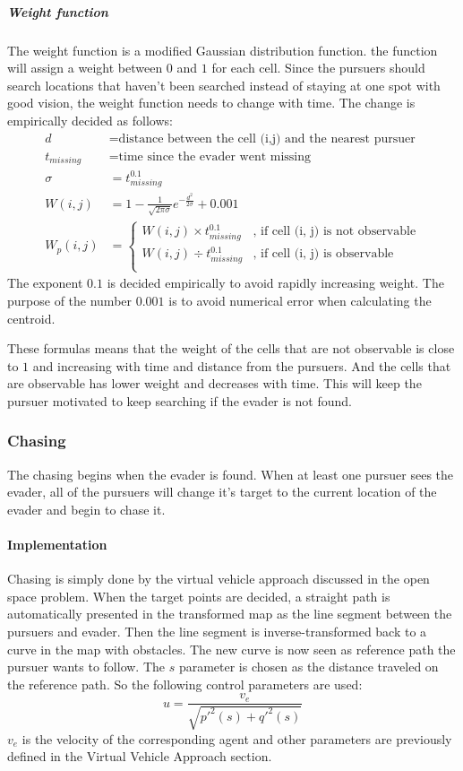 \documentclass[ebook,11pt] {kth-mag}
\begin{document}
\subparagraph{Weight function}
The weight function is a modified Gaussian distribution function. the function will assign a weight between $0$ and $1$ for each cell. Since the pursuers should search locations that haven't been searched instead of staying at one spot with good vision, the weight function needs to change with time. The change is empirically decided as follows: 
\begin{equation}
\begin{split}
d & = \textrm{distance between the cell (i,j) and the nearest pursuer} \\
t_{missing} & = \textrm{time since the evader went missing} \\
\sigma & = t_{missing}^{0.1} \\
W(i, j) & = 1-\frac{1}{\sqrt{2 \pi \sigma}} e^{-\frac{d^2}{2\sigma}}+0.001 \\ 
W_p(i, j) & = 
\begin{cases}
W(i, j)\times t_{missing}^{0.1} & \textrm{, if cell (i, j) is not observable} \\
W(i, j)\div t_{missing}^{0.1} & \textrm{, if cell (i, j) is observable} \\
\end{cases}
\end{split}
\end{equation}
The exponent $0.1$ is decided empirically to avoid rapidly increasing weight. The purpose of the number $0.001$ is to avoid numerical error when calculating the centroid. 

These formulas means that the weight of the cells that are not observable is close to $1$ and increasing with time and distance from the pursuers. And the cells that are observable has lower weight and decreases with time. This will keep the pursuer motivated to keep searching if the evader is not found. 

\subsubsection{Chasing}
The chasing begins when the evader is found. When at least one pursuer sees the evader, all of the pursuers will change it's target to the current location of the evader and begin to chase it. 

\paragraph{Implementation}
Chasing is simply done by the virtual vehicle approach discussed in the open space problem. When the target points are decided, a straight path is automatically presented in the transformed map as the line segment between the pursuers and evader. Then the line segment is inverse-transformed back to a curve in the map with obstacles. The new curve is now seen as reference path the pursuer wants to follow. The $s$ parameter is chosen as the distance traveled on the reference path. So the following control parameters are used:
$$
u = \frac{v_e}{\sqrt{p'^2(s)+q'^2(s)}} 
$$
$v_e$ is the velocity of the corresponding agent and other parameters are previously defined in the Virtual Vehicle Approach section. 
\end{document}
